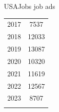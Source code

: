 \documentclass{beamer}
\begin{document}
\begin{frame}{USAJobs job ads}
\begin{table}[ht!]
\begin{subtable}[t]{0.4\linewidth}
\begin{tabular}{cc}
                2017 &   7537\\
                2018 &  12033\\
                2019 &  13087\\
                2020 &  10320\\
                2021 &  11619\\
                2022 &  12567\\
                2023 &   8707\\
            \Xhline{3\arrayrulewidth}
        \end{tabular}\label{tab:aaw_job_opening_count}
    \end{subtable}
\end{table}
  
\end{frame}
\end{document}
